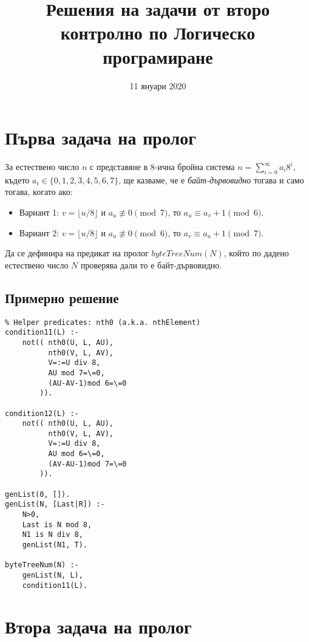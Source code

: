 \documentclass[12pt]{article}
\title{Решения на задачи от второ контролно по Логическо програмиране}
\date{11 януари 2020}
\newenvironment{longlisting}{\captionsetup{type=listing}}{}
\begin{document}
\maketitle %
\newpage
\newpage %
\section{Първа задача на пролог}
    За естествено число $n$ с представяне в 8-ична бройна система $n=\sum_{i=0}^{\infty} a_i 8^i$, където $a_i\in \{0,1,2,3,4,5,6,7\}$, ще казваме, че
    е \emph{байт-дървовидно} тогава и само тогава, когато ако:
    \begin{itemize}
        \item Вариант 1: $v=\lfloor{u/8}\rfloor$ и $a_u\not\equiv 0 \pmod 7$, то $a_{u}\equiv a_v+1\pmod 6$.
        \item Вариант 2: $v=\lfloor{u/8}\rfloor$ и $a_u\not\equiv 0\pmod 6$, то $a_{v}\equiv a_u+1\pmod 7$.
    \end{itemize}
    Да се дефинира на предикат на пролог $byteTreeNum(N)$, който по дадено естествено число $N$ проверява дали то е байт-дървовидно.
\subsection{Примерно решение} 
\begin{longlisting}
    \begin{verbatim}
% Helper predicates: nth0 (a.k.a. nthElement)
condition11(L) :-
    not(( nth0(U, L, AU),
          nth0(V, L, AV),
          V=:=U div 8,
          AU mod 7=\=0,
          (AU-AV-1)mod 6=\=0
        )).

condition12(L) :-
    not(( nth0(U, L, AU),
          nth0(V, L, AV),
          V=:=U div 8,
          AU mod 6=\=0,
          (AV-AU-1)mod 7=\=0
        )).

genList(0, []).
genList(N, [Last|R]) :-
    N>0,
    Last is N mod 8,
    N1 is N div 8,
    genList(N1, T).

byteTreeNum(N) :-
    genList(N, L),
    condition11(L).
\end{verbatim}
\end{longlisting}

\newpage
\section{Втора задача на пролог}
\end{document}

